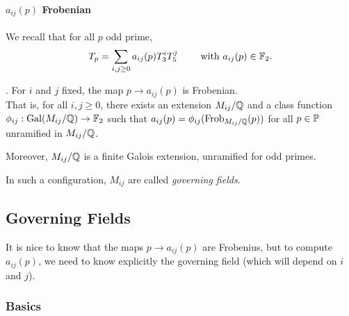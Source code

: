 \paragraph{$a_{ij}(p)$ Frobenian}

We recall that for all $p$ odd prime, 
$$
T_p = \sum_{i,j \geq 0} a_{ij}(p)T_3^iT_5^j
\qquad \text{ with } a_{ij}(p) \in \mathbb{F}_2.
$$
\begin{theorem}\cite[§7]{StructureAlgebreHecke}.
	For $i$ and $j$ fixed, the map $p \to a_{ij}(p)$ is Frobenian.\\
	That is, for all $i,j \geq 0$, there exists an extension $M_{ij}/\mathbb{Q}$ and a class function $\phi_{ij}: \text{Gal}(M_{ij}/\mathbb{Q}) \to \mathbb{F}_2$ such that $a_{ij}(p)=\phi_{ij}(\text{Frob}_{M_{ij}/\mathbb{Q}}(p))$ for all $p \in \mathbb{P}$ unramified in $M_{ij}/\mathbb{Q}$.
	
	Moreover, $M_{ij}/\mathbb{Q}$ is a finite Galois extension, unramified for odd primes.
\end{theorem}
In such a configuration, $M_{ij}$ are called \textit{governing fields}.

%
%
%


\subsection{Governing Fields}
It is nice to know that the maps $p \to a_{ij}(p)$ are Frobenius, but to compute $a_{ij}(p)$, we need to know explicitly the governing field (which will depend on $i$ and $j$).
\subsubsection{Basics}
